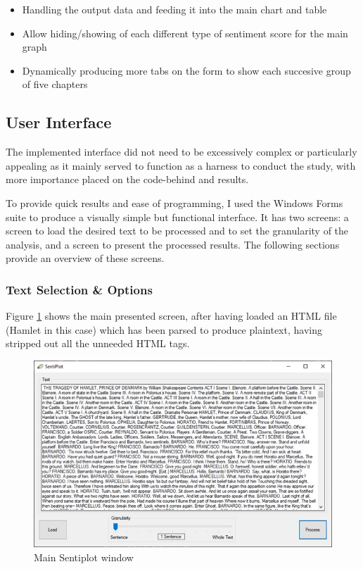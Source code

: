 \documentclass{article}
\begin{document}
            \begin{itemize}
                \item Handling the output data and feeding it into the main chart and table
                \item Allow hiding/showing of each different type of sentiment score for the main graph
                \item Dynamically producing more tabs on the form to show each succesive group of five chapters
            \end{itemize}
    \subsection{User Interface}
        The implemented interface did not need to be excessively complex or particularly appealing as it mainly served to function as a harness to conduct the study, with more importance placed on the code-behind and results.

        To provide quick results and ease of programming, I used the Windows Forms suite to produce a visually simple but functional interface. It has two screens: a screen to load the desired text to be processed and to set the granularity of the analysis, and a screen to present the processed results. The following sections provide an overview of these screens.
    \subsubsection{Text Selection \& Options}
    Figure \ref{fig:sentiplot} shows the main presented screen, after having loaded an HTML file (Hamlet in this case) which has been parsed to produce plaintext, having stripped out all the unneeded HTML tags.
        \begin{figure}[H]
            \includegraphics[width=1\textwidth]{Misc/sentiplot}
            \caption{Main Sentiplot window}
            \label{fig:sentiplot}
        \end{figure}
\end{document}
